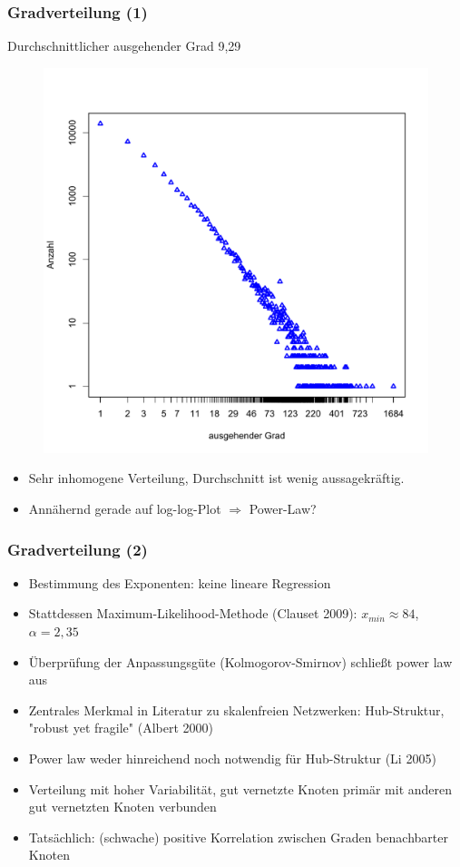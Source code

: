 \documentclass[10pt]{beamer}
\begin{document}
\begin{frame}
  \frametitle{Gradverteilung (1)}
  Durchschnittlicher ausgehender Grad 9,29
  \begin{figure}
    \centering
    \includegraphics[scale=0.3]{../ausarbeitung/images/outdegree-dist.pdf}
  \end{figure}
\begin{itemize}
\item Sehr inhomogene Verteilung, Durchschnitt ist wenig
aussagekr\"aftig.
\item Ann\"ahernd gerade auf log-log-Plot $\Rightarrow$ Power-Law?
\end{itemize}
\end{frame}

\begin{frame}
  \frametitle{Gradverteilung (2)}
  \begin{itemize}
  \item Bestimmung des Exponenten: keine lineare Regression
  \item Stattdessen Maximum-Likelihood-Methode (Clauset 2009):
    $x_{min} \approx 84$, $\alpha = 2,35$
  \item \"Uberpr\"ufung der Anpassungsg\"ute (Kolmogorov-Smirnov) schlie{\ss}t power law
    aus
  \item Zentrales Merkmal in Literatur zu skalenfreien Netzwerken:
    Hub-Struktur, "robust yet fragile" (Albert 2000)
  \item Power law weder hinreichend noch notwendig f\"ur Hub-Struktur
    (Li 2005)
  \item Verteilung mit hoher Variabilit\"at, gut vernetzte Knoten
    prim\"ar mit anderen gut vernetzten Knoten verbunden
  \item Tats\"achlich: (schwache) positive Korrelation zwischen Graden
    benachbarter Knoten
  \end{itemize}
\end{frame}
\end{document}
